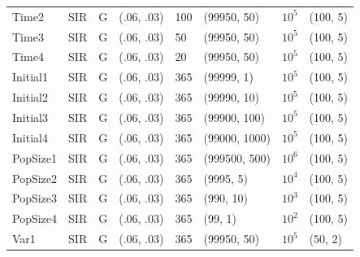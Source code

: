 \documentclass[12pt]{article}
\begin{document}
\begin{table}[]
\begin{tabular}{@{}llllllll@{}}
  Time2 & SIR &  G   & (.06, .03)                          &     100       &  (99950, 50)                    &  $10^5$          &(100, 5)                                \\
  Time3 & SIR &  G   & (.06, .03)                          &     50       &  (99950, 50)                    &  $10^5$          &(100, 5)                                \\
  Time4 & SIR &  G   & (.06, .03)                          &     20       &  (99950, 50)                    &  $10^5$          &(100, 5)                                \\ \midrule
  Initial1    & SIR      &   G             & (.06, .03)                          &     365       &  (99999, 1)                    &  $10^5$          &(100, 5)                                \\
  Initial2    & SIR      &   G             & (.06, .03)                          &     365       &  (99990, 10)                    &  $10^5$          &(100, 5)                                \\
  Initial3    & SIR      &   G             & (.06, .03)                          &     365       &  (99900, 100)                    &  $10^5$          &(100, 5)                                \\
  Initial4    & SIR      &   G             & (.06, .03)                          &     365       &  (99000, 1000)                    &  $10^5$          &(100, 5)                                \\ \midrule
PopSize1      & SIR      &   G             & (.06, .03)                          &     365       &  (999500, 500)                    &  $10^6$          &(100, 5)                                \\
PopSize2      & SIR      &   G             & (.06, .03)                          &     365       &  (9995, 5)                    &  $10^4$          &(100, 5)                                \\
PopSize3        & SIR      &   G             & (.06, .03)                          &     365       &  (990, 10)                    &  $10^3$          &(100, 5)                                \\
PopSize4       & SIR      &   G             & (.06, .03)                          &     365       &  (99, 1)                    &  $10^2$          &(100, 5)                                \\
 \midrule
  Var1      & SIR      &   G             & (.06, .03)                          &     365       &  (99950, 50)                    &  $10^5$          &(50, 2)                                \\

\end{tabular}
\end{table}
\end{document}
